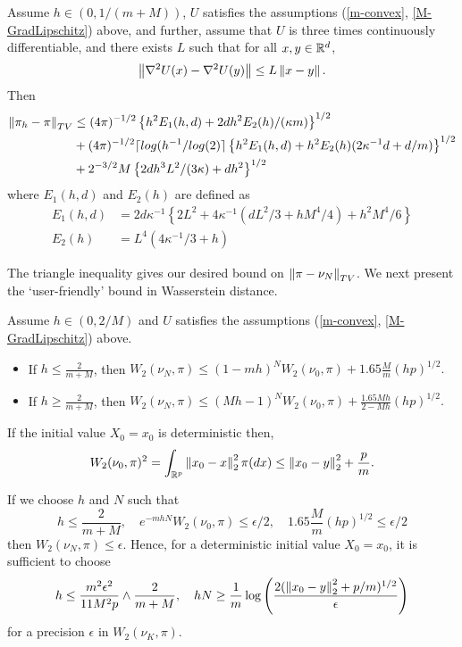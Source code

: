 \begin{theorem}
    Assume $h \in (0, 1/(m+M))$, $U$ satisfies the assumptions (\ref{m-convex}, \ref{M-GradLipschitz}) above, and further, assume that $U$ is three times continuously differentiable, and there exists $L$ such that for all $x,y \in \mathbb{R}^d$,
    $$
    \norm{\grad^2 U(x) - \grad^2 U(y)} \leq L \norm{x-y}.
    $$
    Then
    \begin{align*}
        \norm{\pi_h - \pi}_{TV} &\leq (4 \pi)^{-1/2} \left\{ h^2 E_1(h, d) + 2dh^2 E_2(h)/(\kappa m)\right\}^{1/2}\\
        &+ (4 \pi)^{-1/2} \lceil log(h^{-1}/log(2) \rceil \left\{ h^2 E_1(h,d) + h^2 E_2(h)(2 \kappa^{-1}d + d/m) \right\}^{1/2}\\
        &+ 2^{-3/2} M \left\{ 2d h^3 L^2/(3\kappa) + dh^2\right\}^{1/2}
    \end{align*}
    where $E_1(h,d)$ and $E_2(h)$ are defined as
    \begin{align*}
        E_1(h,d) &= 2 d \kappa^{-1} \left\{2L^2 + 4 \kappa^{-1} (dL^2/3 + h M^4 /4) + h^2 M^4/6 \right\}\\
        E_2(h) &= L^4(4\kappa^{-1}/3 + h)
    \end{align*}
\end{theorem}

The triangle inequality gives our desired bound on $\norm{\pi - \nu_N}_{TV}$.  We next present the `user-friendly' bound in Wasserstein distance.

\begin{theorem}
    Assume $h \in (0, 2/M)$ and $U$ satisfies the assumptions (\ref{m-convex}, \ref{M-GradLipschitz}) above. 
    \begin{itemize}
        \item If $h \leq \frac{2}{m+M}$, then $W_2(\nu_N, \pi) \leq (1-mh)^N W_2(\nu_0, \pi) + 1.65 \frac{M}{m}(hp)^{1/2}.$
        \item If $h \geq \frac{2}{m+M}$, then $W_2(\nu_N, \pi) \leq (Mh-1)^N W_2(\nu_0, \pi) + \frac{1.65Mh}{2-Mh}(hp)^{1/2}.$
\end{itemize}
\end{theorem}
\begin{prop}
    If the initial value $X_0 = x_0$ is deterministic then,
    $$
    W_2(\nu_0, \pi)^2 = \int_{\R^p} \norm{x_0-x}_2^2 \pi(dx) \leq \norm{x_0-y}_2^2 + \frac{p}{m}.
    $$
\end{prop}

\begin{remark}
    If we choose $h$ and $N$ such that
    $$
    h \leq \frac{2}{m+M}, \quad e^{-mhN}W_2(\nu_0, \pi) \leq \epsilon/2, \quad 1.65\frac{M}{m}(hp)^{1/2} \leq \epsilon/2
    $$
    then $W_2(\nu_N,\pi) \leq \epsilon$.  Hence, for a deterministic initial value $X_0=x_0$, it is sufficient to choose
    $$
    h \leq \frac{m^2 \epsilon^2}{11M^2p} \wedge \frac{2}{m+M}, \quad hN \geq \frac{1}{m} \log \left( \frac{2(\norm{x_0-y}_2^2+p/m)^{1/2}}{\epsilon} \right)
    $$
    for a precision $\epsilon$ in $W_2(\nu_K, \pi)$.
\end{remark}

